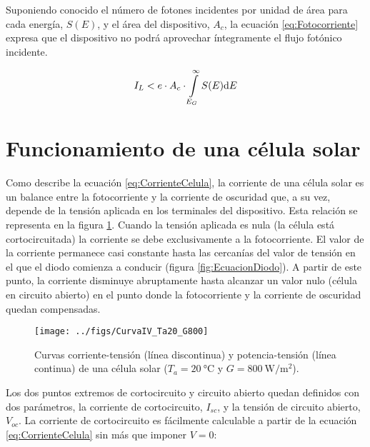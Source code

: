 Suponiendo conocido el número de fotones incidentes por unidad de
área para cada energía, $S(E)$, y el área del dispositivo, $A_c$,
la ecuación \ref{eq:Fotocorriente} expresa que el dispositivo no
podrá aprovechar íntegramente el flujo fotónico incidente.

\begin{equation}
I_{L}<e\cdot A_c\cdot\intop_{E_{G}}^{\infty}S(E)\mathrm{d}E\label{eq:Fotocorriente}\end{equation}



\section{Funcionamiento de una célula solar}

Como describe la ecuación \ref{eq:CorrienteCelula}, la corriente
de una célula solar es un balance entre la fotocorriente y la corriente
de oscuridad que, a su vez, depende de la tensión aplicada en los
terminales del dispositivo. Esta relación se representa en la figura
\ref{fig:CurvaIVCelula}. Cuando la tensión aplicada es nula (la célula
está cortocircuitada) la corriente se debe exclusivamente a la fotocorriente.
El valor de la corriente permanece casi constante hasta las cercanías
del valor de tensión en el que el diodo comienza a conducir (figura
\ref{fig:EcuacionDiodo}). A partir de este punto, la corriente disminuye
abruptamente hasta alcanzar un valor nulo (célula en circuito abierto)
en el punto donde la fotocorriente y la corriente de oscuridad quedan
compensadas. 


%
\begin{figure}
\begin{centering}
\texttt{[image: ../figs/CurvaIV\_Ta20\_G800]}
\end{centering}

\caption{Curvas corriente-tensión (línea discontinua) y potencia-tensión (línea
continua) de una célula solar ($T_a=\SI{20}{\celsius}$ y $G=\SI{800}{\watt\per\meter\squared}$).\label{fig:CurvaIVCelula}}

\end{figure}



Los dos puntos extremos de cortocircuito y circuito abierto quedan
definidos con dos parámetros, la corriente de cortocircuito, $I_{sc}$,
y la tensión de circuito abierto, $V_{oc}$.
La corriente de cortocircuito es fácilmente calculable a partir de
la ecuación \ref{eq:CorrienteCelula} sin más que imponer $V=0$:

